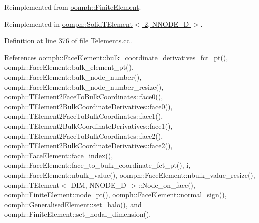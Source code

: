 Reimplemented from \hyperlink{classoomph_1_1FiniteElement_aaf7bead5b462cfd5401d97b3dbdc7af7}{oomph\+::\+Finite\+Element}.



Reimplemented in \hyperlink{classoomph_1_1SolidTElement_3_012_00_01NNODE__1D_01_4_a6357d971d1a29e15ec8fbd47c2945524}{oomph\+::\+Solid\+T\+Element$<$ 2, N\+N\+O\+D\+E\+\_\+D $>$}.



Definition at line 376 of file Telements.\+cc.



References oomph\+::\+Face\+Element\+::bulk\+\_\+coordinate\+\_\+derivatives\+\_\+fct\+\_\+pt(), oomph\+::\+Face\+Element\+::bulk\+\_\+element\+\_\+pt(), oomph\+::\+Face\+Element\+::bulk\+\_\+node\+\_\+number(), oomph\+::\+Face\+Element\+::bulk\+\_\+node\+\_\+number\+\_\+resize(), oomph\+::\+T\+Element2\+Face\+To\+Bulk\+Coordinates\+::face0(), oomph\+::\+T\+Element2\+Bulk\+Coordinate\+Derivatives\+::face0(), oomph\+::\+T\+Element2\+Face\+To\+Bulk\+Coordinates\+::face1(), oomph\+::\+T\+Element2\+Bulk\+Coordinate\+Derivatives\+::face1(), oomph\+::\+T\+Element2\+Face\+To\+Bulk\+Coordinates\+::face2(), oomph\+::\+T\+Element2\+Bulk\+Coordinate\+Derivatives\+::face2(), oomph\+::\+Face\+Element\+::face\+\_\+index(), oomph\+::\+Face\+Element\+::face\+\_\+to\+\_\+bulk\+\_\+coordinate\+\_\+fct\+\_\+pt(), i, oomph\+::\+Face\+Element\+::nbulk\+\_\+value(), oomph\+::\+Face\+Element\+::nbulk\+\_\+value\+\_\+resize(), oomph\+::\+T\+Element$<$ D\+I\+M, N\+N\+O\+D\+E\+\_\+D $>$\+::\+Node\+\_\+on\+\_\+face(), oomph\+::\+Finite\+Element\+::node\+\_\+pt(), oomph\+::\+Face\+Element\+::normal\+\_\+sign(), oomph\+::\+Generalised\+Element\+::set\+\_\+halo(), and oomph\+::\+Finite\+Element\+::set\+\_\+nodal\+\_\+dimension().

\mbox{\label{classoomph_1_1TElement_3_012_00_01NNODE__1D_01_4_ab8f127689821bd33998c2fd9ae313dc2}} 
